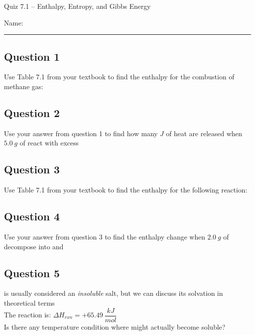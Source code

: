 \documentclass[11pt, letterpaper]{memoir}
\begin{document}
	\begin{center}
		{\large Quiz 7.1 --	Enthalpy, Entropy, and Gibbs Energy}
	\end{center}
	{\large Name: \rule[-1mm]{4in}{.1pt} 

\subsection*{Question 1}
Use Table 7.1 from your textbook to find the enthalpy for the combustion of methane gas:\\ 

\vspace{5em}
\subsection*{Question 2}
Use your answer from question 1 to find how many $J$ of heat are released when $5.0~g$ of  react with excess 

\vspace{5em}
\subsection*{Question 3}
Use Table 7.1 from your textbook to find the enthalpy for the following reaction:\\ 

\vspace{5em}
\subsection*{Question 4}
Use your answer from question 3 to find the enthalpy change when $2.0~g$ of  decompose into  and 

\vspace{5em}
\subsection*{Question 5}
 is usually considered an \emph{insoluble} salt, but we can discuss its solvation in theoretical terms\\
The reaction is: \hspace{1em}$\Delta H_{rxn} = +65.49~\dfrac{kJ}{mol}$\\
Is there any temperature condition where  might actually become soluble?

\newpage
{}
\pagestyle{empty}
\addtocounter{page}{-1}
}
\end{document}
